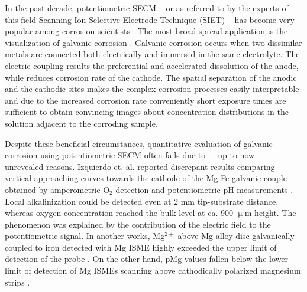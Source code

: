 \documentclass[3p]{elsarticle}
\begin{document}
In the past decade, potentiometric SECM -- or as referred to by the experts of this field Scanning Ion Selective Electrode Technique (SIET) -- has become very popular among corrosion scientists \cite{lamaka, ZnISME, diamondel, cutedge, H+selective, simulating}.
The most broad spread application is the visualization of galvanic corrosion \cite{amperopot, chloride, spatiozn, fezn}.
Galvanic corrosion occurs when two dissimilar metals are connected both electrically and immersed in the same electrolyte. 
The electric coupling results the preferential and accelerated dissolution of the anode, while reduces corrosion rate of the cathode.
The spatial separation of the anodic and the cathodic sites makes the complex corrosion processes easily interpretable and due to the increased corrosion rate conveniently short exposure times are sufficient to obtain convincing images about concentration distributions in the solution adjacent to the corroding sample.

Despite these beneficial circumstances, quantitative evaluation of galvanic corrosion using potentiometric SECM often fails due to –- up to now –- unrevealed reasons.
Izquierdo et. al. reported discrepant results comparing vertical approaching curves towards the cathode of the Mg-Fe galvanic couple obtained by amperometric O$_2$ detection and potentiometric pH measurements \cite{pH15}. Local alkalinization could be detected even at 2 mm tip-substrate distance, whereas oxygen concentration reached the bulk level at ca. 900 $\upmu$m height. The phenomenon was explained by the contribution of the electric field to the potentiometric signal.  
In another works, Mg$^{2+}$ above Mg alloy disc galvanically coupled to iron detected with Mg ISME highly exceeded the upper limit of detection of the probe \cite{overmg1, overmg2, overmg3}.
On the other hand, pMg values fallen below the lower limit of detection of Mg ISMEs scanning above cathodically polarized magnesium strips \cite{belowmg}. 
\end{document}
